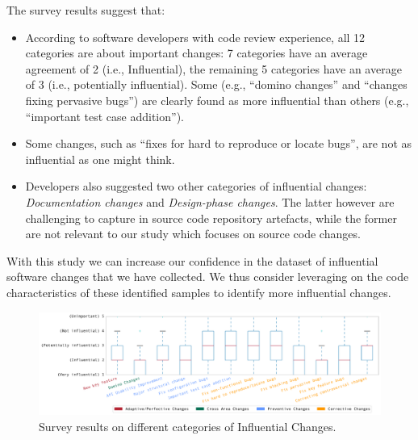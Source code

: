 The survey results suggest that:
\begin{itemize}
	\item According to software developers with code review experience, all 12 categories are about important changes: 7 categories have an average agreement of 2 (i.e., Influential), the remaining 5 categories have an average of 3 (i.e., potentially influential). Some (e.g.,  ``domino changes'' and ``changes fixing pervasive bugs'') are clearly found as more influential than others (e.g., ``important test case addition'').
	\item Some changes, such as ``fixes for hard to reproduce or locate bugs'', are not as influential as one might think.
	\item Developers also suggested two other categories of influential changes: {\em Documentation changes} and {\em Design-phase changes}. The latter however are challenging to capture in source code repository artefacts, while the former are not relevant to our study which focuses on source code changes.
\end{itemize}

With this study we can increase our confidence in the dataset of influential
software changes that we have collected. We thus consider leveraging on the
code characteristics of these identified samples to identify more influential
changes.




\begin{landscape}

 \begin{figure}
 \centering
\scriptsize
\includegraphics[width=\linewidth]{fig/response-boxplot.pdf}
\caption{Survey results on different categories of Influential Changes.}
\label{fig:survey}
 \end{figure}

\end{landscape}

